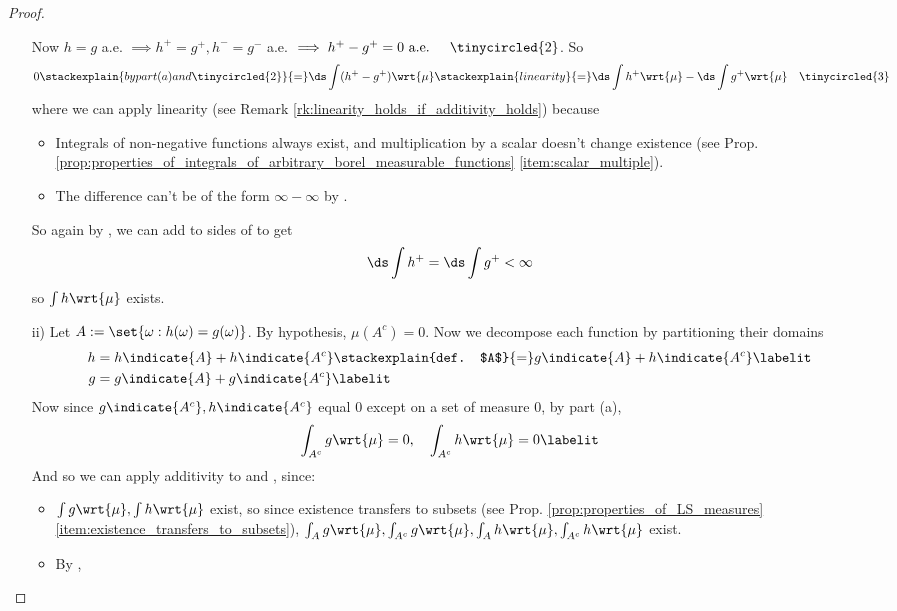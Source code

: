 \documentclass{article} %
\newcommand{\dint}{\ds\int}
\newcommand{\dmu}{\wrt{\mu}}
\begin{document}
\begin{proof}
\begin{alphabate}
\begin{enumerate}
		Now $h=g$ a.e. $\implies h^+=g^+, h^-=g^-$ a.e. $\implies h^+ - g^+ = 0 \text{ a.e. } \quad \tinycircled{2}$.   So
	\begin{align*}
	0 \stackexplain{by part (a) and \tinycircled{2}}{=} \ds\int (h^+ - g^+) \dmu \stackexplain{linearity}{=} 	\ds\int h^+ \dmu  - \ds\int g^+ \dmu && \tinycircled{3}
	\end{align*}
	where we can apply linearity (see Remark \ref{rk:linearity_holds_if_additivity_holds}) because
		\begin{itemize}
		\item Integrals of non-negative functions always exist, and multiplication by a scalar doesn't change existence (see Prop. \ref{prop:properties_of_integrals_of_arbitrary_borel_measurable_functions} \ref{item:scalar_multiple}).
		\item The difference can't be of the form $\infty - \infty$ by .
		\end{itemize}
	So again by , we can add to  sides of  to get
	\[ \dint h^+ = \dint g^+ < \infty \]
	so $\int h \dmu$ exists.
	\item[ii)] Let $A:=\set{\omega : h(\omega) = g(\omega)}$.  By hypothesis, $\mu(A^c)=0$. Now we decompose each function by partitioning their domains
	\begin{align*}
	h&=h\indicate{A} + h\indicate{A^c}  \stackexplain{def. $A$}{=} g \indicate{A} + h \indicate{A^c} \labelit \label{eqn:decompose_h_by_domain}\\
	g&= g\indicate{A} + g\indicate{A^c}  \labelit \label{eqn:decompose_g_by_domain}\\	
	\end{align*}
	 Now since $g \indicate{A^c}, h \indicate{A^c}$ equal 0 except on a set of measure 0, by part (a),
	\begin{align*}
	\int_{A^c} g \dmu =0, \quad  \int_{A^c} h \dmu =0
	\labelit\label{eqn:integrals_on_set_of_measure_zero}	
	\end{align*}
	And so we can apply additivity to  and , since:
		\begin{itemize}
		\item $\int g \dmu, \int h \dmu$ exist, so since existence transfers to subsets (see Prop. \ref{prop:properties_of_LS_measures}\ref{item:existence_transfers_to_subsets}), $\int_A g \dmu, \int_{A^c} g \dmu, \int_A h \dmu, \int_{A^c} h \dmu $ exist.  
		\item By ,

\end{itemize}
\end{enumerate}
\end{alphabate}
\end{proof}
\end{document}
